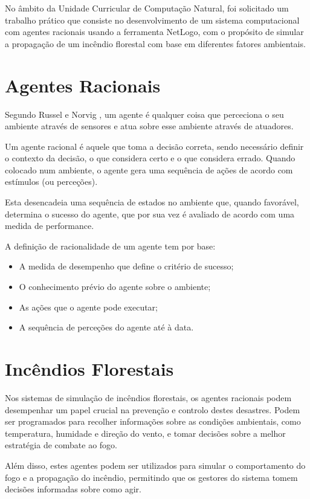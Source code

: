 No âmbito da Unidade Curricular de Computação Natural, foi solicitado um trabalho prático que consiste no desenvolvimento de um sistema computacional com agentes racionais usando a ferramenta NetLogo, com o propósito de simular a propagação de um incêndio florestal com base em diferentes fatores ambientais.

\section{Agentes Racionais}\label{sec:rational_agents}

Segundo Russel e Norvig \cite{Russel2010}, um agente é qualquer coisa que perceciona o seu ambiente através de sensores e atua sobre esse ambiente através de atuadores.

Um agente racional é aquele que toma a decisão correta, sendo necessário definir o contexto da decisão, o que considera certo e o que considera errado. Quando colocado num ambiente, o agente gera uma sequência de ações de acordo com estímulos (ou perceções). \cite{Russel2010}

Esta desencadeia uma sequência de estados no ambiente que, quando favorável, determina o sucesso do agente, que por sua vez é avaliado de acordo com uma medida de performance.

A definição de racionalidade de um agente tem por base:
\begin{itemize}
    \item A medida de desempenho que define o critério de sucesso;
    \item O conhecimento prévio do agente sobre o ambiente;
    \item As ações que o agente pode executar;
    \item A sequência de perceções do agente até à data.
\end{itemize}

\section{Incêndios Florestais}\label{sec:forest_fires}

Nos sistemas de simulação de incêndios florestais, os agentes racionais podem desempenhar um papel crucial na prevenção e controlo destes desastres. Podem ser programados para recolher informações sobre as condições ambientais, como temperatura, humidade e direção do vento, e tomar decisões sobre a melhor estratégia de combate ao fogo. 

Além disso, estes agentes podem ser utilizados para simular o comportamento do fogo e a propagação do incêndio, permitindo que os gestores do sistema tomem decisões informadas sobre como agir.


